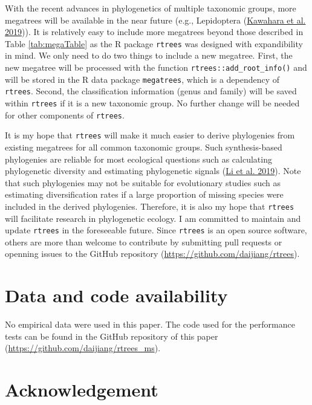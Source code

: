 \documentclass[
  12pt,
]{article}
\begin{document}
With the recent advances in phylogenetics of multiple taxonomic groups, more megatrees will be available in the near future (e.g., Lepidoptera (\protect\hyperlink{ref-kawahara2019phylogenomics}{Kawahara et al. 2019})). It is relatively easy to include more megatrees beyond those described in Table \ref{tab:megaTable} as the R package \texttt{rtrees} was designed with expandibility in mind. We only need to do two things to include a new megatree. First, the new megatree will be processed with the function \texttt{rtrees::add\_root\_info()} and will be stored in the R data package \texttt{megatrees}, which is a dependency of \texttt{rtrees}. Second, the classification information (genus and family) will be saved within \texttt{rtrees} if it is a new taxonomic group. No further change will be needed for other components of \texttt{rtrees}.

It is my hope that \texttt{rtrees} will make it much easier to derive phylogenies from existing megatrees for all common taxonomic groups. Such synthesis-based phylogenies are reliable for most ecological questions such as calculating phylogenetic diversity and estimating phylogenetic signals (\protect\hyperlink{ref-li2019common}{Li et al. 2019}). Note that such phylogenies may not be suitable for evolutionary studies such as estimating diversification rates if a large proportion of missing species were included in the derived phylogenies. Therefore, it is also my hope that \texttt{rtrees} will facilitate research in phylogenetic ecology. I am committed to maintain and update \texttt{rtrees} in the foreseeable future. Since \texttt{rtrees} is an open source software, others are more than welcome to contribute by submitting pull requests or openning issues to the GitHub repository (\url{https://github.com/daijiang/rtrees}).

\hypertarget{data-and-code-availability}{%
\section{Data and code availability}\label{data-and-code-availability}}

No empirical data were used in this paper. The code used for the performance tests can be found in the GitHub repository of this paper (\url{https://github.com/daijiang/rtrees_ms}).

\hypertarget{acknowledgement}{%
\section{Acknowledgement}\label{acknowledgement}}
\end{document}
